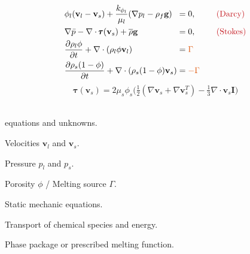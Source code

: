 \documentclass[usenames,dvipsnames,letterpaper,landscape,final]{slides}
\theoremstyle{definition}
\begin{document}
\begin{myslide}
		  \begin{center}
		  \end{center}
\begin{equation*}
\begin{alignedat}{3}
		  &\phi_l (\mathbf{v}_l - \mathbf{v}_s)
		  + \frac{k_{\phi_l}}{\mu_l}(\nabla p_l - \rho_f\mathbf{g})
	    &&= 0, \qquad &&\Maroon{\text{(Darcy)}}\\
		  &\nabla\bar p - \nabla \cdot \pmb{\tau}(\mathbf{v}_s) + \overline{\rho}\mathbf{g}&&= 0, \qquad &&\Maroon{\text{(Stokes)}}\\
&\frac{\partial \rho_l \phi}{\partial t} + \nabla\cdot (\rho_l \phi \mathbf{v}_l) &&= \Oorange{\Gamma}  \qquad && \\
&\frac{\partial \rho_s (1-\phi)}{\partial t} + \nabla\cdot (\rho_s (1-\phi) \mathbf{v}_s) &&= \Oorange{-\Gamma}  \qquad && 
\end{alignedat}
\end{equation*}
\begin{equation*}\label{eq:deviatoricstress}
		  \pmb{\tau}(\mathbf{v}_s)
		  = 2\mu_s\phi_s\big( \tfrac{1}{2}(\nabla \mathbf{v}_s + \nabla \mathbf{v}_s^T) - \tfrac{1}{3}\nabla \cdot \mathbf{v}_s \mathbf{I}\big)
\end{equation*}

\parbox{0.5\textwidth}{\raggedright
{} \\
 equations and  unknowns.
\begin{blist}
\item Velocities $\mathbf{v}_l$ and $\mathbf{v}_s$.
\item Pressure $p_l$ and $p_s$.
\item Porosity $\phi$ / Melting source $\Gamma$.
\end{blist}
}\parbox{0.5\textwidth}{\raggedright
{}
\begin{blist}
\item Static mechanic equations.
\item Transport of chemical species and energy.
\item Phase package or prescribed melting function.
\end{blist}
}

\end{myslide}
\end{document}
